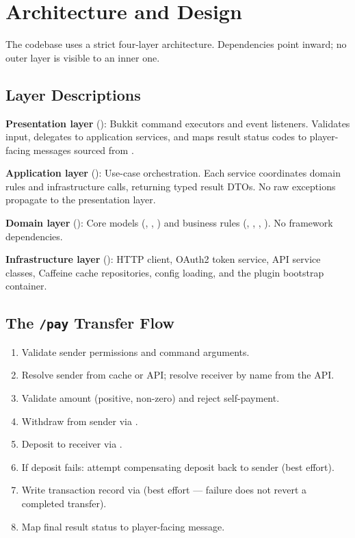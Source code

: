 \section{Architecture and Design}

The codebase uses a strict four-layer architecture. Dependencies point inward; no outer layer is visible to an inner one.

\subsection{Layer Descriptions}

\textbf{Presentation layer} (): Bukkit command executors and event listeners. Validates input, delegates to application services, and maps result status codes to player-facing messages sourced from .

\textbf{Application layer} (): Use-case orchestration. Each service coordinates domain rules and infrastructure calls, returning typed result DTOs. No raw exceptions propagate to the presentation layer.

\textbf{Domain layer} (): Core models (, , ) and business rules (, , , ). No framework dependencies.

\textbf{Infrastructure layer} (): HTTP client, OAuth2 token service, API service classes, Caffeine cache repositories, config loading, and the plugin bootstrap container.

\subsection{The \texttt{/pay} Transfer Flow}

\begin{enumerate}
  \item Validate sender permissions and command arguments.
  \item Resolve sender from cache or API; resolve receiver by name from the API.
  \item Validate amount (positive, non-zero) and reject self-payment.
  \item Withdraw from sender via .
  \item Deposit to receiver via .
  \item If deposit fails: attempt compensating deposit back to sender (best effort).
  \item Write transaction record via  (best effort — failure does not revert a completed transfer).
  \item Map final result status to player-facing message.
\end{enumerate}

